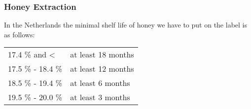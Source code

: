 \subsubsection{Honey Extraction}

In the Netherlands the minimal shelf life of honey we have to put on the label is as follows:

\begin{table}[H]%
  \begin{center}
    \begin{tabular}{ll}
      17.4 \% and <     & at least 18 months \\
      17.5 \% - 18.4 \% & at least 12 months \\
      18.5 \% - 19.4 \% & at least 6 months \\
      19.5 \% - 20.0 \% & at least 3 months \\
    \end{tabular}
  \end{center}
\end{table}
